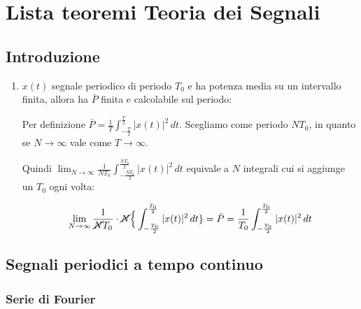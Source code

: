 \documentclass[
  paper=a4,
  ,captions=tableheading
]{scrartcl}
\author{}
\date{}
\title{}
\author{}
\date{}
\begin{document}




\section{Lista teoremi Teoria dei
Segnali}\label{lista-teoremi-teoria-dei-segnali}

\subsection{Introduzione}\label{introduzione}

\begin{enumerate}
\def\labelenumi{\arabic{enumi}.}
\item
  \(x(t)\) segnale periodico di periodo \(T_0\) e ha potenza media su un
  intervallo finita, allora ha \(\bar{P}\) finita e calcolabile sul
  periodo:

  Per definizione
  \(\bar{P}= \frac{1}{T} \int_{-\frac{T}{2}}^{\frac{T}{2}} |x(t)|^{2} \,dt\).
  Scegliamo come periodo \(NT_0\), in quanto se \(N\to \infty\) vale
  come \(T\to \infty\).

  Quindi
  \(\displaystyle \lim_{N \to \infty} \frac{1}{NT_0} \int_{-\frac{NT_0}{2}}^{\frac{NT_0}{2}} |x(t)|^{2} \,dt\)
  equivale a \(N\) integrali cui si aggiunge un \(T_0\) ogni volta:

  \[
   \displaystyle \lim_{N \to \infty} \frac{1}{\cancel{N}T_0} \cdot \cancel{N} \Big \{ \int_{-\frac{T_0}{2}}^{\frac{T_0}{2}} |x(t)|^{2} \,dt \} = \bar{P} = \frac{1}{T_0} \int_{-\frac{T_0}{2}}^{\frac{T_0}{2}} |x(t)|^{2} \,dt
   \]
\end{enumerate}

\subsection{Segnali periodici a tempo
continuo}\label{segnali-periodici-a-tempo-continuo}

\subsubsection{Serie di Fourier}\label{serie-di-fourier}
\end{document}
